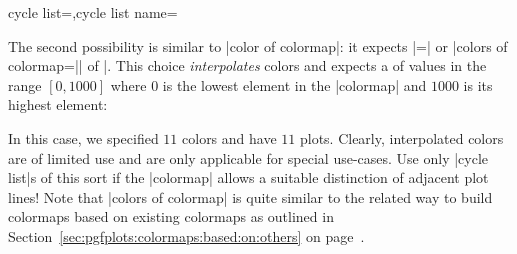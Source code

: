 \begin{pgfplotskeylist}{cycle list=,cycle list name=}
{The second possibility is similar to |color of colormap|: it expects |=| or |colors of colormap=|| of |. This choice \emph{interpolates} colors and expects a  of values in the range $[0,1000]$ where $0$ is the lowest element in the |colormap| and $1000$ is its highest element:
\begin{codeexample}[]
\end{codeexample}
In this case, we specified $11$ colors and have $11$ plots. Clearly, interpolated colors are of limited use and are only applicable for special use-cases. Use only |cycle list|s of this sort if the |colormap| allows a suitable distinction of adjacent plot lines! Note that |colors of colormap| is quite similar to the related way to build colormaps based on existing colormaps as outlined in Section~\ref{sec:pgfplots:colormaps:based:on:others} on page~\pageref{sec:pgfplots:colormaps:based:on:others}.

}
\end{pgfplotskeylist}

